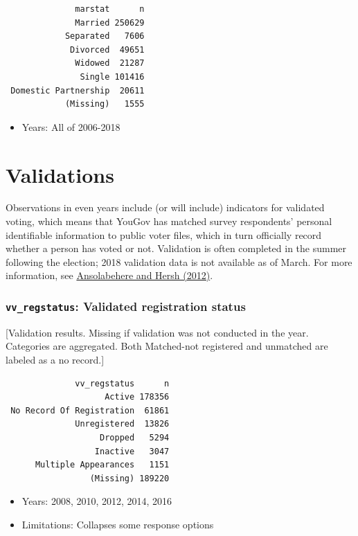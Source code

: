 \documentclass[10pt,article,oneside]{memoir}
\theoremstyle{definition}
\begin{document}
\begin{verbatim}
              marstat      n
              Married 250629
            Separated   7606
             Divorced  49651
              Widowed  21287
               Single 101416
 Domestic Partnership  20611
            (Missing)   1555
\end{verbatim}

\begin{itemize}
\tightlist
\item
  Years: All of 2006-2018
\end{itemize}

\newpage

\section{Validations}\label{validations}

Observations in even years include (or will include) indicators for
validated voting, which means that YouGov has matched survey
respondents' personal identifiable information to public voter files,
which in turn officially record whether a person has voted or not.
Validation is often completed in the summer following the election; 2018
validation data is not available as of March. For more information, see
\href{https://doi.org/10.1093/pan/mps023}{Ansolabehere and Hersh
(2012)}.

\subsubsection{\texorpdfstring{\texttt{vv\_regstatus}: Validated
registration
status}{vv\_regstatus: Validated registration status}}\label{vv_regstatus-validated-registration-status}

{[}Validation results. Missing if validation was not conducted in the
year. Categories are aggregated. Both Matched-not registered and
unmatched are labeled as a no record.{]}

\begin{verbatim}
              vv_regstatus      n
                    Active 178356
 No Record Of Registration  61861
              Unregistered  13826
                   Dropped   5294
                  Inactive   3047
      Multiple Appearances   1151
                 (Missing) 189220
\end{verbatim}

\begin{itemize}
\tightlist
\item
  Years: 2008, 2010, 2012, 2014, 2016
\item
  Limitations: Collapses some response options
\end{itemize}
\end{document}
